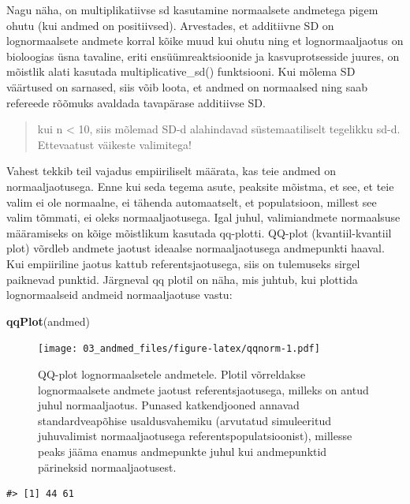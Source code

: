 \documentclass[]{book}
\newenvironment{Shaded}{\begin{snugshade}}{\end{snugshade}}
\newcommand{\KeywordTok}[1]{\textcolor[rgb]{0.13,0.29,0.53}{\textbf{#1}}}
\newcommand{\NormalTok}[1]{#1}
\begin{document}
Nagu näha, on multiplikatiivse sd kasutamine normaalsete andmetega pigem
ohutu (kui andmed on positiivsed). Arvestades, et additiivne SD on
lognormaalsete andmete korral kõike muud kui ohutu ning et
lognormaaljaotus on bioloogias üsna tavaline, eriti ensüümreaktsioonide
ja kasvuprotsesside juures, on mõistlik alati kasutada
multiplicative\_sd() funktsiooni. Kui mõlema SD väärtused on sarnased,
siis võib loota, et andmed on normaalsed ning saab refereede rõõmuks
avaldada tavapärase additiivse SD.

\begin{quote}
kui n \textless{} 10, siis mõlemad SD-d alahindavad süstemaatiliselt
tegelikku sd-d. Ettevaatust väikeste valimitega!
\end{quote}

Vahest tekkib teil vajadus empiiriliselt määrata, kas teie andmed on
normaaljaotusega. Enne kui seda tegema asute, peaksite mõistma, et see,
et teie valim ei ole normaalne, ei tähenda automaatselt, et
populatsioon, millest see valim tõmmati, ei oleks normaaljaotusega. Igal
juhul, valimiandmete normaalsuse määramiseks on kõige mõistlikum
kasutada qq-plotti. QQ-plot (kvantiil-kvantiil plot) võrdleb andmete
jaotust ideaalse normaaljaotusega andmepunkti haaval. Kui empiiriline
jaotus kattub referentsjaotusega, siis on tulemuseks sirgel paiknevad
punktid. Järgneval qq plotil on näha, mis juhtub, kui plottida
lognormaalseid andmeid normaaljaotuse vastu:








\begin{Shaded}
\begin{Highlighting}[]
\KeywordTok{qqPlot}\NormalTok{(andmed)}
\end{Highlighting}
\end{Shaded}

\begin{figure}
\centering
\texttt{[image: 03\_andmed\_files/figure-latex/qqnorm-1.pdf]}
\caption{\label{fig:qqnorm}QQ-plot lognormaalsetele andmetele. Plotil võrreldakse
lognormaalsete andmete jaotust referentsjaotusega, milleks on antud
juhul normaaljaotus. Punased katkendjooned annavad standardveapõhise
usaldusvahemiku (arvutatud simuleeritud juhuvalimist normaaljaotusega
referentspopulatsioonist), millesse peaks jääma enamus andmepunkte juhul
kui andmepunktid pärineksid normaaljaotusest.}
\end{figure}

\begin{verbatim}
#> [1] 44 61
\end{verbatim}
\end{document}
